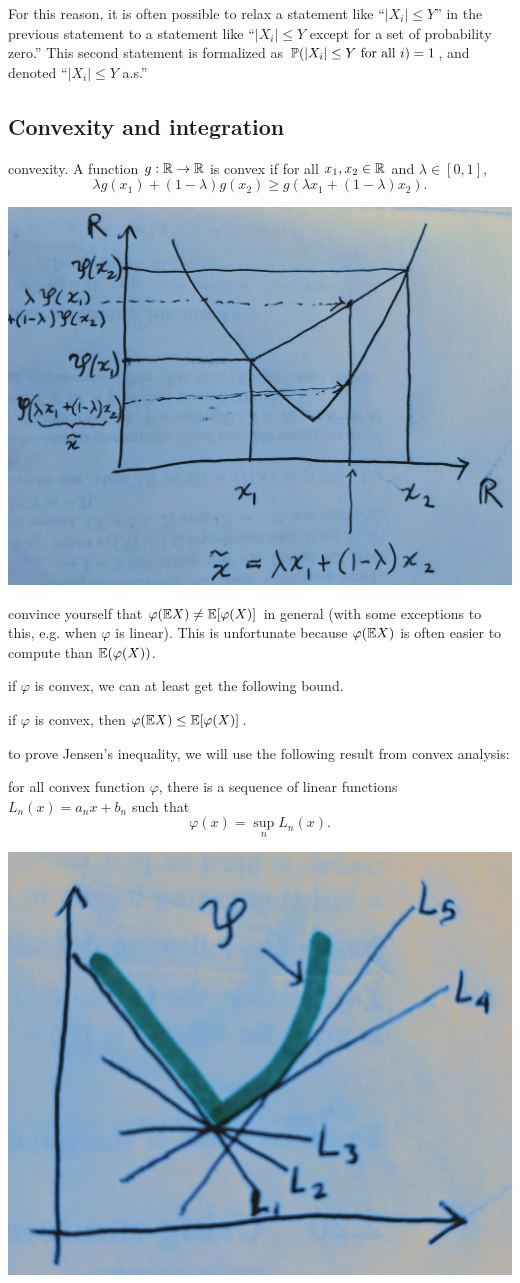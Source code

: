 \documentclass{article}
\begin{document}
For this reason, it is often possible to relax a statement like ``$|X_i| \le Y$'' in the previous statement to a statement like ``$|X_i| \le Y$ except for a set of probability zero.'' This second statement is formalized as $\P(|X_i| \le Y \text{ for all }i) = 1$, and denoted ``$|X_i| \le Y$ a.s.''


\subsection{Convexity and integration}

 convexity. A function $g : \R \to \R$ is convex if for all $x_1, x_2 \in \R$ and $\lambda \in [0, 1]$, 
\[ \lambda g(x_1) + (1 - \lambda) g(x_2) \ge g(\lambda x_1 + (1 - \lambda) x_2). \]
\begin{center}
	\includegraphics[width=0.6\linewidth]{figures/convex}
\end{center}

 convince yourself that $\varphi(\E X) \neq \E[\varphi(X)]$ in general (with some exceptions to this, e.g. when $\varphi$ is linear). This is unfortunate because $\varphi(\E X)$ is often easier to compute than $\E(\varphi(X))$.

 if $\varphi$ is convex, we can at least get the following bound.

 if $\varphi$ is convex, then $\varphi(\E X) \le \E[\varphi(X)]$.

 to prove Jensen's inequality, we will use the following result from convex analysis:

 for all convex function $\varphi$, there is a sequence of linear functions $L_n(x) = a_n x + b_n$ such that 
\[ \varphi(x) = \sup_n L_n(x). \]
\begin{center}
	\includegraphics[width=0.3\linewidth]{figures/convex-support}
\end{center}
\end{document}
